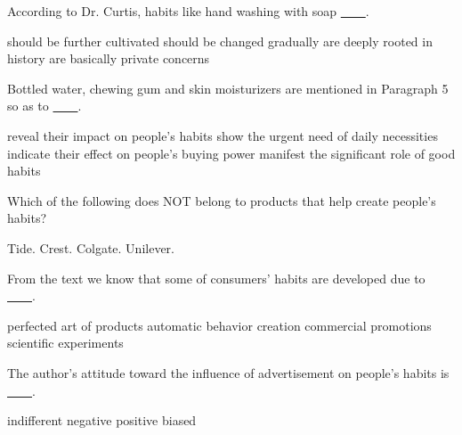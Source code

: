 \item According to Dr. Curtis, habits like hand washing with soap \uline{~~~~}.
\begin{tasks}
	\task should be further cultivated
	\task should be changed gradually
	\task are deeply rooted in history
	\task are basically private concerns
\end{tasks}
\item Bottled water, chewing gum and skin moisturizers are mentioned in Paragraph 5 so as to \uline{~~~~}.
\begin{tasks}
	\task reveal their impact on people's habits
	\task show the urgent need of daily necessities
	\task indicate their effect on people's buying power
	\task manifest the significant role of good habits
\end{tasks}
\item Which of the following does NOT belong to products that help create people's habits?
\begin{tasks}
	\task Tide.
	\task Crest.
	\task Colgate.
	\task Unilever.
\end{tasks}
\item From the text we know that some of consumers' habits are developed due to \uline{~~~~}.
\begin{tasks}
	\task perfected art of products
	\task automatic behavior creation
	\task commercial promotions
	\task scientific experiments
\end{tasks}
\item The author's attitude toward the influence of advertisement on people's habits is \uline{~~~~}.
\begin{tasks}
	\task indifferent
	\task negative
	\task positive
	\task biased
\end{tasks}